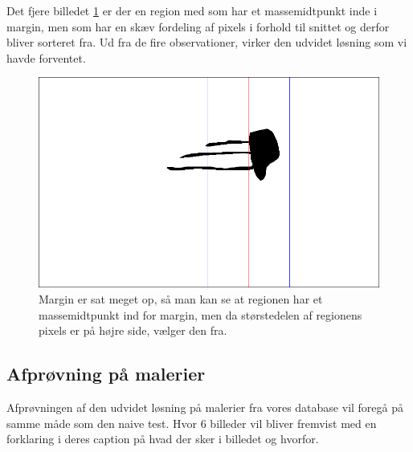 Det fjere billedet \ref{bleksprutte_test} er der en region med som har
et massemidtpunkt inde i margin, men som har en skæv fordeling af pixels
i forhold til snittet og derfor bliver sorteret fra. Ud fra de fire
observationer, virker den udvidet løsning som vi havde forventet.

\begin{figure}[h!!]
	\begin{center}
		\includegraphics[scale=0.3,angle=0]{afsnit/afprovning/billeder/udvidet_losning/udvidet_bleksprutte_test.png}
	\end{center}
	\caption[]{Margin er sat meget op, så man kan se at regionen har et massemidtpunkt ind for margin, men da størstedelen af regionens pixels er på højre side, vælger den fra.}
	\label{bleksprutte_test}
\end{figure}
\clearpage

\subsection{Afprøvning på malerier}
Afprøvningen af den udvidet løsning på malerier fra vores database vil foregå på samme måde som den naive test. Hvor 6 billeder vil bliver fremvist med en forklaring i deres caption på hvad der sker i billedet og hvorfor.


